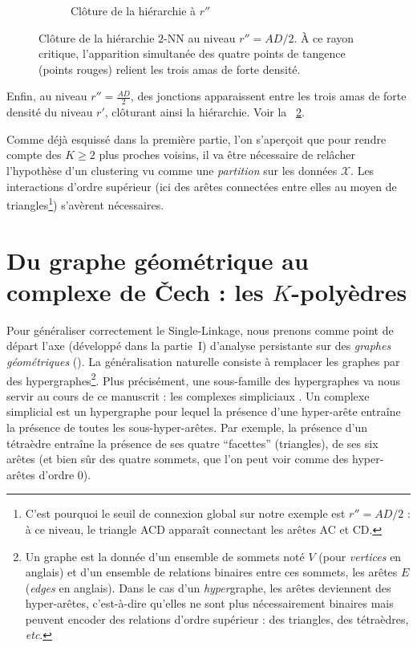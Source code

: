\begin{figure}[htbp]
\begin{subfigure}[b]{0.51\textwidth}
\begin{tikzpicture}[scale=0.65]
        \end{tikzpicture}
        \caption{Clôture de la hiérarchie à $r''$}
        \label{fig:fusion_rsecond}
    \end{subfigure}
    
    \caption{Clôture de la hiérarchie $2$-NN au niveau $r'' = AD/2$. À ce rayon critique, l'apparition simultanée des quatre points de tangence (points rouges) relient les trois amas de forte densité.}
    \label{fig:complexe_rsecond}
\end{figure}

Enfin, au niveau $r''= \frac{AD}{2}$, des jonctions apparaissent entre les trois amas de forte densité du niveau $r'$, clôturant ainsi la hiérarchie. Voir la \Fig~\ref{fig:complexe_rsecond}.

Comme déjà esquissé dans la première partie, l'on s'aperçoit que pour rendre compte des $K \ge 2$ plus proches voisins, il va être nécessaire de relâcher l'hypothèse d'un clustering vu comme une \emph{partition} sur les données $\mathcal X$.
Les interactions d'ordre supérieur (ici des arêtes connectées entre elles au moyen de triangles\footnote{C'est pourquoi le seuil de connexion global sur notre exemple est  $r'' = AD/2$ : à ce niveau, le triangle ACD apparaît connectant les arêtes AC et CD.}) s'avèrent nécessaires.


\section{Du graphe géométrique au complexe de \v Cech : les $K$-polyèdres}
\label{sec:KPolyedres}

Pour généraliser correctement le Single-Linkage, nous prenons comme point de départ l'axe (développé dans la partie~I) d'analyse persistante sur des \emph{graphes géométriques} ().
La généralisation naturelle consiste à remplacer les graphes par des hypergraphes\footnote{Un graphe est la donnée d'un ensemble de sommets noté $V$ (pour \emph{vertices} en anglais) et d'un ensemble de relations binaires entre ces sommets, les arêtes $E$ (\emph{edges} en anglais). Dans le cas d'un \emph{hyper}graphe, les arêtes deviennent des hyper-arêtes, c'est-à-dire qu'elles ne sont plus nécessairement binaires mais peuvent encoder des relations d'ordre supérieur : des triangles, des tétraèdres, \emph{etc}.}.
Plus précisément, une sous-famille des hypergraphes va nous servir au cours de ce manuscrit : les complexes simpliciaux \cite{Munkres}. Un complexe simplicial est un hypergraphe pour lequel la présence d'une hyper-arête entraîne la présence de toutes les sous-hyper-arêtes. Par exemple, la présence d'un tétraèdre entraîne la présence de ses quatre ``facettes'' (triangles), de ses six arêtes (et bien sûr des quatre sommets, que l'on peut voir comme des hyper-arêtes d'ordre $0$).

